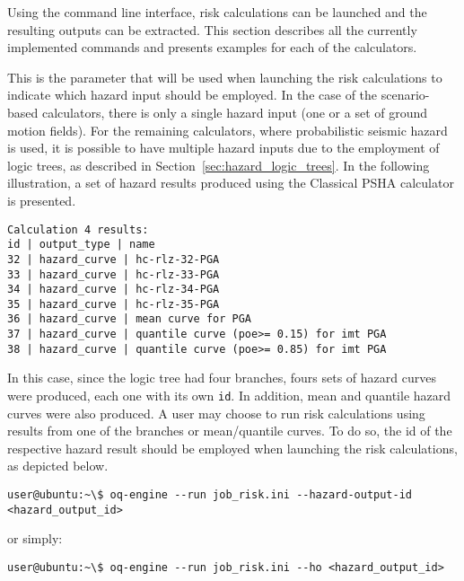 Using the command line interface, risk calculations can be launched and the
resulting outputs can be extracted. This section describes all the currently
implemented commands and presents examples for each of the calculators.

This is the parameter that will be used when launching the risk calculations
to indicate which hazard input should be employed. In the case of the
scenario-based calculators, there is only a single hazard input (one or a set
of ground motion fields). For the remaining calculators, where probabilistic
seismic hazard is used, it is possible to have multiple hazard inputs due to
the employment of logic trees, as described in
Section~\ref{sec:hazard_logic_trees}. In the following illustration, a set of
hazard results produced using the Classical PSHA calculator is presented.

\begin{Verbatim}[frame=single, commandchars=\\\{\}, samepage=true]
Calculation 4 results:
id | output_type | name
32 | hazard_curve | hc-rlz-32-PGA
33 | hazard_curve | hc-rlz-33-PGA
34 | hazard_curve | hc-rlz-34-PGA
35 | hazard_curve | hc-rlz-35-PGA
36 | hazard_curve | mean curve for PGA
37 | hazard_curve | quantile curve (poe>= 0.15) for imt PGA
38 | hazard_curve | quantile curve (poe>= 0.85) for imt PGA
\end{Verbatim}

In this case, since the logic tree had four branches, fours sets of hazard
curves were produced, each one with its own \verb+id+. In addition, mean and
quantile hazard curves were also produced. A user may choose to run risk
calculations using results from one of the branches or mean/quantile curves.
To do so, the id of the respective hazard result should be employed when
launching the risk calculations, as depicted below.

\begin{Verbatim}[frame=single, commandchars=\\\{\}, samepage=true]
user@ubuntu:~\$ oq-engine --run job_risk.ini --hazard-output-id <hazard_output_id>
\end{Verbatim}

or simply:

\begin{Verbatim}[frame=single, commandchars=\\\{\}, samepage=true]
user@ubuntu:~\$ oq-engine --run job_risk.ini --ho <hazard_output_id>
\end{Verbatim}

